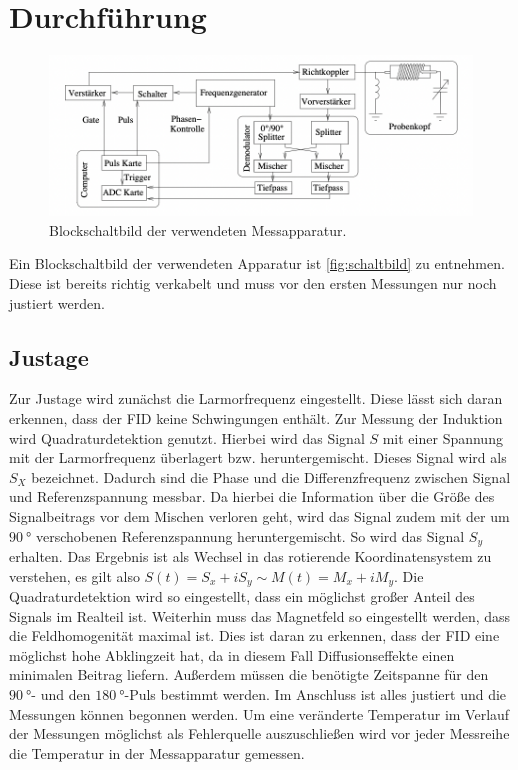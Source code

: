 \section{Durchführung}

\begin{figure}[tb]
  \centering
  \includegraphics[width=\textwidth,keepaspectratio]{schaltbild.png}
  \caption{Blockschaltbild der verwendeten Messapparatur\cite{info}.}
  \label{fig:schaltbild}
\end{figure}

Ein Blockschaltbild der verwendeten Apparatur ist \autoref{fig:schaltbild} zu entnehmen. Diese ist bereits richtig verkabelt und muss vor den ersten Messungen nur noch justiert werden.

\subsection{Justage}
Zur Justage wird zunächst die Larmorfrequenz eingestellt. Diese lässt sich daran erkennen, dass der FID keine Schwingungen enthält.
Zur Messung der Induktion wird Quadraturdetektion genutzt. Hierbei wird das Signal $S$ mit einer Spannung mit der Larmorfrequenz überlagert bzw. heruntergemischt. Dieses Signal wird als $S_X$ bezeichnet. Dadurch sind die Phase und die Differenzfrequenz zwischen Signal und Referenzspannung messbar. Da hierbei die Information über die Größe des Signalbeitrags vor dem Mischen verloren geht, wird das Signal zudem mit der um $\SI{90}{\degree}$ verschobenen Referenzspannung heruntergemischt. So wird das Signal $S_y$ erhalten. Das Ergebnis ist als Wechsel in das rotierende Koordinatensystem zu verstehen, es gilt also $S(t) = S_x + i S_y \sim M(t) = M_x + i M_y$. Die Quadraturdetektion wird so eingestellt, dass ein möglichst großer Anteil des Signals im Realteil ist.
Weiterhin muss das Magnetfeld so eingestellt werden, dass die Feldhomogenität maximal ist. Dies ist daran zu erkennen, dass der FID eine möglichst hohe Abklingzeit hat, da in diesem Fall Diffusionseffekte einen minimalen Beitrag liefern.
Außerdem müssen die benötigte Zeitspanne für den $\SI{90}{\degree}$- und den $\SI{180}{\degree}$-Puls bestimmt werden.
Im Anschluss ist alles justiert und die Messungen können begonnen werden. Um eine veränderte Temperatur im Verlauf der Messungen möglichst als Fehlerquelle auszuschließen wird vor jeder Messreihe die Temperatur in der Messapparatur gemessen.

